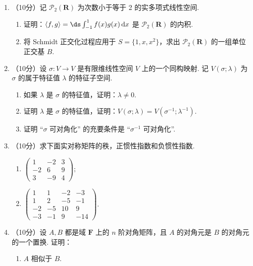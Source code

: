 \begin{enumerate}
    \item （10分）记 $\mathcal{P}_2(\mathbf{R})$ 为次数小于等于 2 的实多项式线性空间.
    \begin{enumerate}
        \item 证明：$\langle f,g\rangle =\ds\int_{-1}^1f(x)g(x)\,\mathrm{d}x$ 是 $\mathcal{P}_2(\mathbf{R})$ 的内积.

        \item 将 Schmidt 正交化过程应用于 $S=\{1,x,x^2\}$，求出 $\mathcal{P}_2(\mathbf{R})$ 的一组单位正交基 $B$.
    \end{enumerate}

    \item （10分）设 $\sigma\colon V\to V$ 是有限维线性空间 $V$ 上的一个同构映射. 记 $V(\sigma;\lambda)$ 为 $\sigma$ 的属于特征值 $\lambda$ 的特征子空间.
    \begin{enumerate}
        \item 如果 $\lambda$ 是 $\sigma$ 的特征值，证明：$\lambda \neq 0$.

        \item 证明 $\lambda$ 是 $\sigma$ 的特征值，证明：$V(\sigma;\lambda)=V(\sigma^{-1};\lambda^{-1})$.

        \item 证明 ``$\sigma$ 可对角化'' 的充要条件是 ``$\sigma^{-1}$ 可对角化''.
    \end{enumerate}

    \item （10分）求下面实对称矩阵的秩，正惯性指数和负惯性指数.
    \begin{enumerate}
        \item $\begin{pmatrix}1 & -2 & 3 \\ -2 & 6 & 9 \\ 3 & -9 & 4\end{pmatrix};$

        \item $\begin{pmatrix}1 & 1 & -2 & -3\\ 1 & 2 & -5 & -1 \\ -2 & -5 & 10 & 9 \\ -3 & -1 & 9 & -14\end{pmatrix}$.
    \end{enumerate}

    \item （10分）设 $A,B$ 都是域 $\mathbf{F}$ 上的 $n$ 阶对角矩阵，且 $A$ 的对角元是 $B$ 的对角元的一个置换. 证明：
    \begin{enumerate}
        \item $A$ 相似于 $B$.


\end{enumerate}
\end{enumerate}
